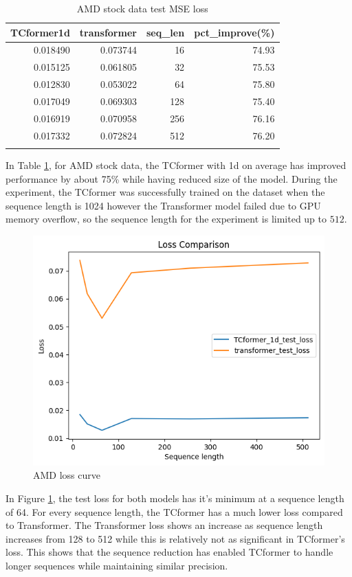 \documentclass[stu,12pt,floatsintext]{apa7}
\begin{document}
\begin{table}[H]
\centering
\begin{tabular}{rrrr}
\toprule
TCformer1d & transformer & seq\_len & pct\_improve(\%) \\
\midrule
0.018490 & 0.073744 & 16 & 74.93 \\
0.015125 & 0.061805 & 32 & 75.53 \\
0.012830 & 0.053022 & 64 & 75.80 \\
0.017049 & 0.069303 & 128 & 75.40 \\
0.016919 & 0.070958 & 256 & 76.16 \\
0.017332 & 0.072824 & 512 & 76.20 \\
\bottomrule \\
\end{tabular}
\caption{AMD stock data test MSE loss}
\label{tab:AMD-loss}
\end{table}

In Table \ref{tab:AMD-loss}, for AMD stock data, the TCformer with 1d on average has improved performance by about 75\% while having reduced size of the model. During the experiment, the TCformer was successfully trained on the dataset when the sequence length is 1024 however the Transformer model failed due to GPU memory overflow, so the sequence length for the experiment is limited up to $512$.

\begin{figure}[H]
    \centering
    \includegraphics[width=0.8\linewidth]{images/AMD-loss-cmp.png}
    \caption{AMD loss curve}
    \label{fig:AMD-loss-curve}
\end{figure}

In Figure \ref{fig:AMD-loss-curve}, the test loss for both models has it's minimum at a sequence length of 64. For every sequence length, the TCformer has a much lower loss compared to Transformer. The Transformer loss shows an increase as sequence length increases from 128 to 512 while this is relatively not as significant in TCformer's loss. This shows that the sequence reduction has enabled TCformer to handle longer sequences while maintaining similar precision. 
\end{document}
